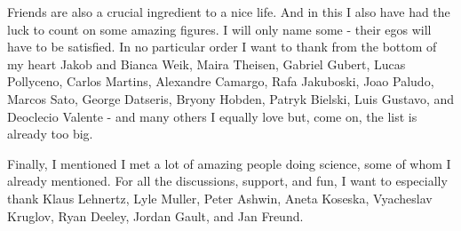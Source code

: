 Friends are also a crucial ingredient to a nice life. And in this I also have had the luck to count on some amazing figures. I will only name some - their egos will have to be satisfied. In no particular order I want to thank from the bottom of my heart Jakob and Bianca Weik, Maira Theisen, Gabriel Gubert, Lucas Pollyceno, Carlos Martins, Alexandre Camargo, Rafa Jakuboski, Joao Paludo, Marcos Sato, George Datseris, Bryony Hobden, Patryk Bielski, Luis Gustavo, and Deoclecio Valente - and many others I equally love but, come on, the list is already too big. 

Finally, I mentioned I met a lot of amazing people doing science, some of whom I already mentioned. For all the discussions, support, and fun, I want to especially thank Klaus Lehnertz, Lyle Muller, Peter Ashwin, Aneta Koseska, Vyacheslav Kruglov, Ryan Deeley, Jordan Gault, and Jan Freund.